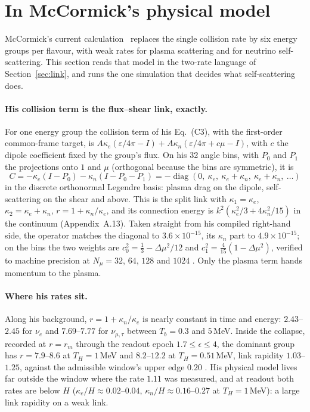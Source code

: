 \section{In McCormick's physical model}\label{sec:mcc}

McCormick's current calculation~\cite{McC2} replaces the single collision rate by six energy groups per flavour, with weak rates for plasma scattering and for neutrino self-scattering. This section reads that model in the two-rate language of Section~\ref{sec:link}, and runs the one simulation that decides what self-scattering does.

\paragraph{His collision term is the flux--shear link, exactly.} For one energy group the collision term of his Eq.~(C3), with the first-order common-frame target, is $A\kappa_e(\varepsilon/4\pi-I)+A\kappa_n(\varepsilon/4\pi+c\mu-I)$, with $c$ the dipole coefficient fixed by the group's flux. On his 32 angle bins, with $P_0$ and $P_1$ the projections onto $1$ and $\mu$ (orthogonal because the bins are symmetric), it is
\begin{equation}
C=-\kappa_e(I-P_0)-\kappa_n(I-P_0-P_1)=-\operatorname{diag}(0,\ \kappa_e,\ \kappa_e+\kappa_n,\ \kappa_e+\kappa_n,\ \dots)
\end{equation}
in the discrete orthonormal Legendre basis: plasma drag on the dipole, self-scattering on the shear and above. This is the split link with $\kappa_1=\kappa_e$, $\kappa_2=\kappa_e+\kappa_n$, $r=1+\kappa_n/\kappa_e$, and its connection energy is $k^2(\kappa_e^2/3+4\kappa_n^2/15)$ in the continuum (Appendix~A.13). Taken straight from his compiled right-hand side, the operator matches the diagonal to $3.6\times10^{-15}$, its $\kappa_n$ part to $4.9\times10^{-15}$; on the bins the two weights are $c_0^2=\tfrac13-\Delta\mu^2/12$ and $c_1^2=\tfrac4{15}(1-\Delta\mu^2)$, verified to machine precision at $N_\mu=32$, $64$, $128$ and $1024$ . Only the plasma term hands momentum to the plasma.

\paragraph{Where his rates sit.} Along his background, $r=1+\kappa_n/\kappa_e$ is nearly constant in time and energy: $2.43$--$2.45$ for $\nu_e$ and $7.69$--$7.77$ for $\nu_{\mu,\tau}$ between $T_b=0.3$ and $5$\,MeV. Inside the collapse, recorded at $r=r_m$ through the readout epoch $1.7\le\epsilon\le4$, the dominant group has $r=7.9$--$8.6$ at $T_H=1$\,MeV and $8.2$--$12.2$ at $T_H=0.51$\,MeV, link rapidity $1.03$--$1.25$, against the admissible window's upper edge $0.20$ . His physical model lives far outside the window where the rate $1.11$ was measured, and at readout both rates are below $H$ ($\kappa_e/H\approx0.02$--$0.04$, $\kappa_n/H\approx0.16$--$0.27$ at $T_H=1$\,MeV): a large link rapidity on a weak link.

